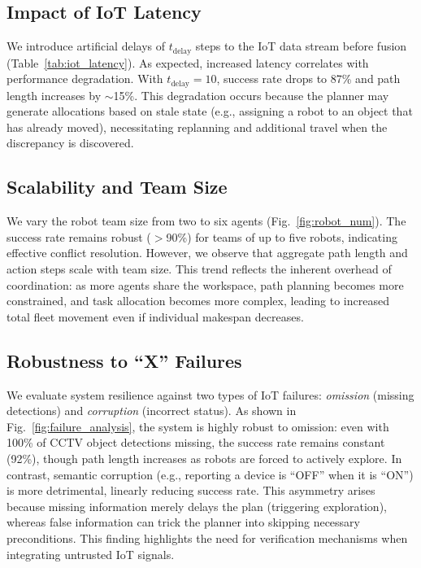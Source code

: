 \subsection{Impact of IoT Latency}
We introduce artificial delays of $t_{\text{delay}}$ steps to the IoT data stream before fusion (Table~\ref{tab:iot_latency}). As expected, increased latency correlates with performance degradation. With $t_{\text{delay}}=10$, success rate drops to 87\% and path length increases by $\sim$15\%. This degradation occurs because the planner may generate allocations based on stale state (e.g., assigning a robot to an object that has already moved), necessitating replanning and additional travel when the discrepancy is discovered.




\subsection{Scalability and Team Size}
We vary the robot team size from two to six agents (Fig.~\ref{fig:robot_num}). The success rate remains robust ($>$90\%) for teams of up to five robots, indicating effective conflict resolution. However, we observe that aggregate path length and action steps scale with team size. This trend reflects the inherent overhead of coordination: as more agents share the workspace, path planning becomes more constrained, and task allocation becomes more complex, leading to increased total fleet movement even if individual makespan decreases.

\subsection{Robustness to ``X'' Failures}
We evaluate system resilience against two types of IoT failures: \emph{omission} (missing detections) and \emph{corruption} (incorrect status). As shown in Fig.~\ref{fig:failure_analysis}, the system is highly robust to omission: even with 100\% of CCTV object detections missing, the success rate remains constant (92\%), though path length increases as robots are forced to actively explore.
In contrast, semantic corruption (e.g., reporting a device is ``OFF'' when it is ``ON'') is more detrimental, linearly reducing success rate. This asymmetry arises because missing information merely delays the plan (triggering exploration), whereas false information can trick the planner into skipping necessary preconditions. This finding highlights the need for verification mechanisms when integrating untrusted IoT signals.

